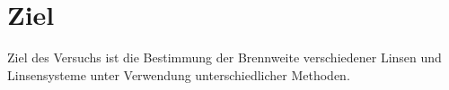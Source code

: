 \section{Ziel}
\label{sec:Ziel}
Ziel des Versuchs ist die Bestimmung der Brennweite verschiedener Linsen und Linsensysteme
unter Verwendung unterschiedlicher Methoden.

